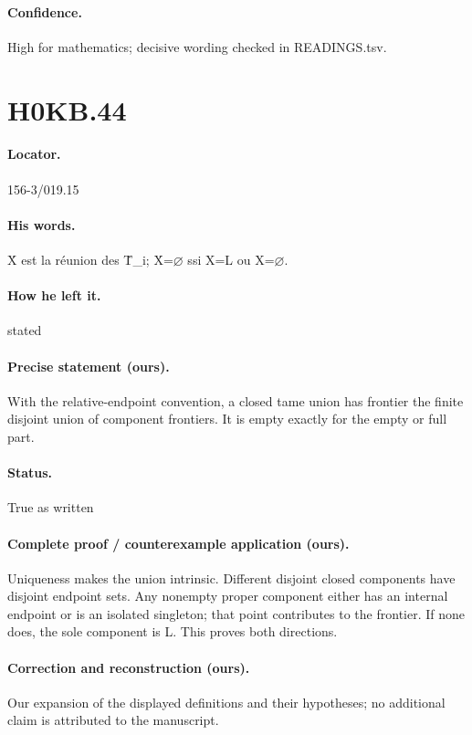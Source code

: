 \paragraph{Confidence.} High for mathematics; decisive wording checked in READINGS.tsv.

\section*{H0KB.44}\label{statement:H0KB.44}
\paragraph{Locator.} 156-3/019.15

\paragraph{His words.} Ẋ est la réunion des Ṫ\_i; Ẋ=\ensuremath{\varnothing} ssi X=L ou X=\ensuremath{\varnothing}.

\paragraph{How he left it.} stated

\paragraph{Precise statement (ours).} With the relative-endpoint convention, a closed tame union has frontier the finite disjoint union of component frontiers. It is empty exactly for the empty or full part.

\paragraph{Status.} True as written

\paragraph{Complete proof / counterexample application (ours).} Uniqueness makes the union intrinsic. Different disjoint closed components have disjoint endpoint sets. Any nonempty proper component either has an internal endpoint or is an isolated singleton; that point contributes to the frontier. If none does, the sole component is L. This proves both directions.

\paragraph{Correction and reconstruction (ours).} Our expansion of the displayed definitions and their hypotheses; no additional claim is attributed to the manuscript.

